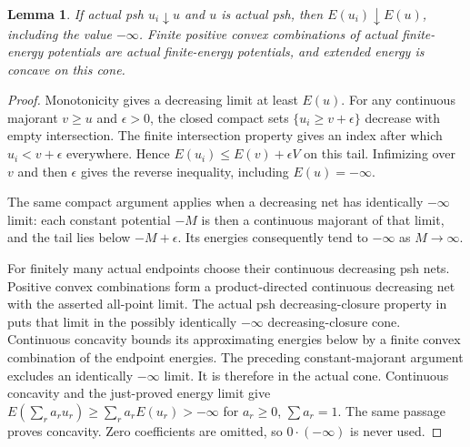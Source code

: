 \documentclass[11pt]{article}
\newtheorem{lemma}[theorem]{Lemma}
\begin{document}
\begin{lemma}\label{lem:energy-net}
If actual psh $u_i\downarrow u$ and $u$ is actual psh, then
$E(u_i)\downarrow E(u)$, including the value $-\infty$.
Finite positive convex combinations of actual finite-energy
potentials are actual finite-energy potentials, and extended energy
is concave on this cone.
\end{lemma}
\begin{proof}
Monotonicity gives a decreasing limit at least $E(u)$. For any
continuous majorant $v\geq u$ and $\epsilon>0$, the closed compact
sets $\{u_i\geq v+\epsilon\}$ decrease with empty intersection.
The finite intersection property gives an index after which
$u_i<v+\epsilon$ everywhere. Hence $E(u_i)\leq E(v)+\epsilon V$
on this tail. Infimizing over $v$ and then $\epsilon$ gives the reverse
inequality, including $E(u)=-\infty$.

The same compact argument applies when a decreasing net has
identically $-\infty$ limit: each constant potential $-M$ is then
a continuous majorant of that limit, and the tail lies below
$-M+\epsilon$. Its energies consequently tend to $-\infty$ as
$M\to\infty$.

For finitely many actual endpoints choose their continuous decreasing
psh nets. Positive convex combinations form a product-directed
continuous decreasing net with the asserted all-point limit.
The actual psh decreasing-closure property in
\cite[Lemma 7.4]{BE} puts that limit in the possibly identically
$-\infty$ decreasing-closure cone. Continuous concavity bounds its
approximating energies below by a finite convex combination of the
endpoint energies. The preceding constant-majorant argument excludes
an identically $-\infty$ limit. It is therefore in the actual cone.
Continuous concavity and the just-proved energy limit give
$E(\sum_r a_ru_r)\geq\sum_r a_rE(u_r)>-\infty$ for
$a_r\geq0$, $\sum a_r=1$. The same passage proves concavity.
Zero coefficients are omitted, so $0\cdot(-\infty)$ is never used.
\end{proof}
\end{document}
